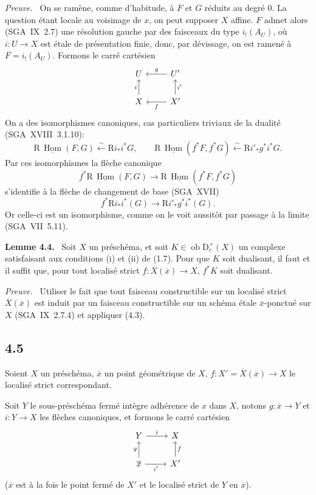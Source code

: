 \documentclass[11pt]{article}
\newenvironment{statement}[1]{\par\medskip\noindent\textbf{#1.}\ }{\par\medskip}
\newenvironment{prooftext}[1][Proof]{\par\noindent\emph{#1.}\ }{\par\medskip}
\DeclareMathOperator{\Hom}{Hom}
\newcommand{\R}{\mathrm{R}}
\newcommand{\D}{\mathrm{D}}
\newcommand{\ob}{\operatorname{ob}}
\newcommand{\ol}[1]{\overline{#1}}
\begin{document}
\begin{prooftext}[Preuve]
On se ramène, comme d'habitude, à $F$ et $G$ réduits au degré $0$. La question étant locale au voisinage de $x$, on peut supposer $X$ affine. $F$ admet alors (SGA~IX~2.7) une résolution gauche par des faisceaux du type $i_!(A_U)$, où $i:U\to X$ est étale de présentation finie, donc, par dévissage, on est ramené à $F=i_!(A_U)$. Formons le carré cartésien
\[
\begin{tikzcd}
U & U' \arrow[l,"g"'] \\
X \arrow[u,"i"] & X' \arrow[l,"f"] \arrow[u,"i'"']
\end{tikzcd}
\]
On a des isomorphismes canoniques, cas particuliers triviaux de la dualité (SGA~XVIII~3.1.10):
\[
\R\,\underline{\Hom}(F,G)\xleftarrow{\sim}\R i_* i^*G,
\qquad
\R\,\underline{\Hom}(f^*F,f^*G)\xleftarrow{\sim}\R i'_* g^*i^*G.
\]
Par ces isomorphismes la flèche canonique
\[
f^*\R\,\underline{\Hom}(F,G)\longrightarrow \R\,\underline{\Hom}(f^*F,f^*G)
\]
s'identifie à la flèche de changement de base (SGA~XVII)
\[
f^*\R i_*i^*(G)\longrightarrow \R i'_*g^*i^*(G).
\]
Or celle-ci est un isomorphisme, comme on le voit aussitôt par passage à la limite (SGA~VII~5.11).
\end{prooftext}

\begin{statement}{Lemme 4.4}
Soit $X$ un préschéma, et soit $K\in\ob\D_c^+(X)$ un complexe satisfaisant aux conditions (i) et (ii) de (1.7). Pour que $K$ soit dualisant, il faut et il suffit que, pour tout localisé strict $f:\ol{X}(\ol{x})\to X$, $f^*K$ soit dualisant.
\end{statement}

\begin{prooftext}[Preuve]
Utiliser le fait que tout faisceau constructible sur un localisé strict $\ol{X}(\ol{x})$ est induit par un faisceau constructible sur un schéma étale $\ol{x}$-ponctué sur $X$ (SGA~IX~2.7.4) et appliquer (4.3).
\end{prooftext}

\subsection*{4.5}
Soient $X$ un préschéma, $\ol{x}$ un point géométrique de $X$, $f:X'=\ol{X}(\ol{x})\to X$ le localisé strict correspondant.

Soit $Y$ le sous-préschéma fermé intègre adhérence de $x$ dans $X$, notons $g:\ol{x}\to Y$ et $i:Y\to X$ les flèches canoniques, et formons le carré cartésien
\[
\begin{tikzcd}
Y \arrow[r,"i"] & X \\
\ol{x} \arrow[u,"g"] \arrow[r,"i'"'] & X' \arrow[u,"f"']
\end{tikzcd}
\]
($\ol{x}$ est à la fois le point fermé de $X'$ et le localisé strict de $Y$ en $\ol{x}$).
\end{document}
